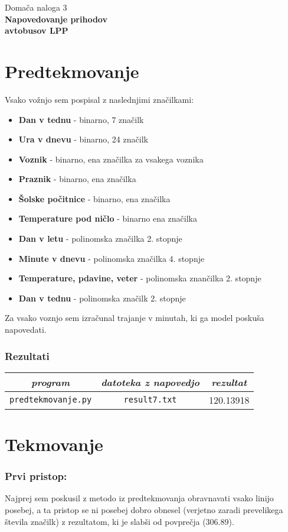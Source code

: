 \documentclass[11pt,a4paper]{article}
\begin{document}
{\huge Domača naloga 3} \\
{\Huge \textbf{Napovedovanje prihodov\\ avtobusov LPP}} \\

\section*{Predtekmovanje}
Vsako vožnjo sem pospisal z naslednjimi značilkami:
\begin{itemize}
	\item \textbf{Dan v tednu} - binarno, 7 značilk
	\item \textbf{Ura v dnevu} - binarno, 24 značilk
	\item \textbf{Voznik} - binarno, ena značilka za vsakega voznika
	\item \textbf{Praznik} - binarno, ena značilka
	\item \textbf{Šolske počitnice} - binarno, ena značilka
	\item \textbf{Temperature pod ničlo} - binarno ena značilka
	\item \textbf{Dan v letu} - polinomska značilka 2. stopnje
	\item \textbf{Minute v dnevu} - polinomska značilka 4. stopnje
	\item \textbf{Temperature, pdavine, veter} - polinomska znančilka 2. stopnje
	\item \textbf{Dan v tednu} - polinomska značilk 2. stopnje
\end{itemize}

Za vsako voznjo sem izračunal trajanje v minutah, ki ga model poskuša napovedati.

\subsubsection*{Rezultati}
\begin{center}
	\begin{tabular}{c | c | c}
		\textit{program} & \textit{datoteka z napovedjo} & \textit{rezultat} \\ \hline
		\texttt{predtekmovanje.py} & \texttt{result7.txt} & 120.13918
	\end{tabular}
\end{center}
\section*{Tekmovanje}

\subsubsection*{Prvi pristop:}
Najprej sem poskusil z metodo iz predtekmovanja obravnavati vsako linijo posebej, a
ta pristop se ni posebej dobro obnesel (verjetno zaradi prevelikega števila značilk) z rezultatom, ki je slabši od povprečja (306.89).
\end{document}
